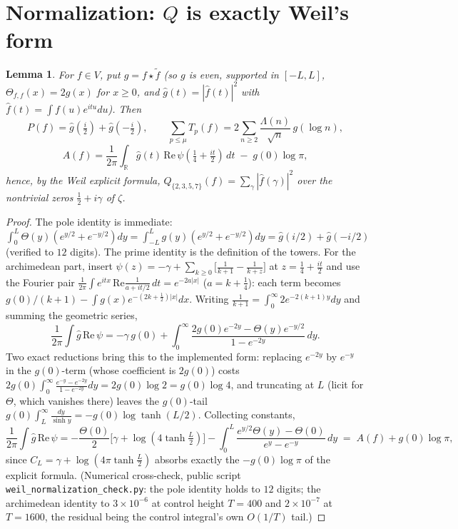 \documentclass[10pt]{article}
\newtheorem{lemma}{Lemma}
\newcommand{\R}{\mathbb{R}}
\begin{document}
\section{Normalization: $Q$ is exactly Weil's form}\label{app:norm}

\begin{lemma}
For $f\in V$, put $g=f\star\tilde f$ (so $g$ is even, supported in
$[-L,L]$, $\Theta_{f,f}(x)=2g(x)$ for $x\ge0$, and
$\hat g(t)=|\hat f(t)|^2$ with $\hat f(t)=\int f(u)e^{itu}du$). Then
\[
P(f)=\hat g(\tfrac i2)+\hat g(-\tfrac i2),\qquad
\sum_{p\le\mu}T_p(f)=2\sum_{n\ge2}\frac{\Lambda(n)}{\sqrt n}\,g(\log n),
\]
\[
A(f)=\frac1{2\pi}\int_{\R}\hat g(t)\,\mathrm{Re}\,
\psi(\tfrac14+\tfrac{it}2)\,dt\;-\;g(0)\log\pi,
\]
hence, by the Weil explicit formula,
$Q_{\{2,3,5,7\}}(f)=\sum_\gamma|\hat f(\gamma)|^2$ over the nontrivial
zeros $\tfrac12+i\gamma$ of $\zeta$.
\end{lemma}
\begin{proof}
The pole identity is immediate:
$\int_0^L\Theta(y)(e^{y/2}+e^{-y/2})dy
=\int_{-L}^{L}g(y)(e^{y/2}+e^{-y/2})dy=\hat g(i/2)+\hat g(-i/2)$
(verified to $12$ digits). The prime identity is the definition of the
towers. For the archimedean part, insert
$\psi(z)=-\gamma+\sum_{k\ge0}\big[\tfrac1{k+1}-\tfrac1{k+z}\big]$
at $z=\tfrac14+\tfrac{it}2$ and use the Fourier pair
$\tfrac1{2\pi}\int e^{itx}\,\mathrm{Re}\tfrac1{a+it/2}\,dt=e^{-2a|x|}$
($a=k+\tfrac14$): each term becomes
$g(0)/(k+1)-\int g(x)e^{-(2k+\frac12)|x|}dx$. Writing
$\tfrac1{k+1}=\int_0^\infty 2e^{-2(k+1)y}dy$ and summing the geometric
series,
\[
\frac1{2\pi}\int\hat g\,\mathrm{Re}\,\psi
=-\gamma\,g(0)+\int_0^\infty
\frac{2g(0)e^{-2y}-\Theta(y)e^{-y/2}}{1-e^{-2y}}\,dy .
\]
Two exact reductions bring this to the implemented form: replacing
$e^{-2y}$ by $e^{-y}$ in the $g(0)$-term (whose coefficient is
$2g(0)$) costs
$2g(0)\int_0^\infty\frac{e^{-y}-e^{-2y}}{1-e^{-2y}}dy=2g(0)\log2
=g(0)\log4$, and
truncating at $L$ (licit for $\Theta$, which vanishes there) leaves the
$g(0)$-tail
$g(0)\int_L^\infty\frac{dy}{\sinh y}=-g(0)\log\tanh(L/2)$.
Collecting constants,
\[
\frac1{2\pi}\int\hat g\,\mathrm{Re}\,\psi
=-\frac{\Theta(0)}2\big[\gamma+\log(4\tanh\tfrac L2)\big]
-\int_0^L\frac{e^{y/2}\Theta(y)-\Theta(0)}{e^{y}-e^{-y}}\,dy
\;=\;A(f)+g(0)\log\pi,
\]
since $C_L=\gamma+\log(4\pi\tanh\tfrac L2)$ absorbs exactly the
$-g(0)\log\pi$ of the explicit formula. (Numerical cross-check, public
script \texttt{weil\_normalization\_check.py}: the pole identity holds
to $12$ digits; the archimedean identity to $3\times10^{-6}$ at control
height $T=400$ and $2\times10^{-7}$ at $T=1600$, the residual being the
control integral's own $O(1/T)$ tail.)
\end{proof}
\end{document}
